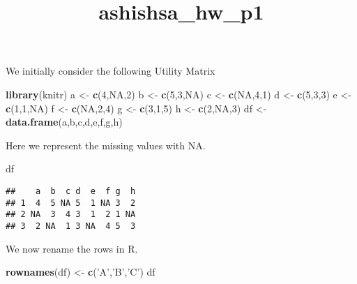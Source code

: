 \documentclass[
]{article}
\title{ashishsa\_hw\_p1}
\author{}
\date{\vspace{-2.5em}}
\newenvironment{Shaded}{\begin{snugshade}}{\end{snugshade}}
\newcommand{\DecValTok}[1]{\textcolor[rgb]{0.00,0.00,0.81}{#1}}
\newcommand{\KeywordTok}[1]{\textcolor[rgb]{0.13,0.29,0.53}{\textbf{#1}}}
\newcommand{\NormalTok}[1]{#1}
\newcommand{\OtherTok}[1]{\textcolor[rgb]{0.56,0.35,0.01}{#1}}
\newcommand{\StringTok}[1]{\textcolor[rgb]{0.31,0.60,0.02}{#1}}
\begin{document}
\maketitle

We initially consider the following Utility Matrix

\begin{Shaded}
\begin{Highlighting}[]
\KeywordTok{library}\NormalTok{(knitr)}
\NormalTok{a <-}\StringTok{ }\KeywordTok{c}\NormalTok{(}\DecValTok{4}\NormalTok{,}\OtherTok{NA}\NormalTok{,}\DecValTok{2}\NormalTok{)}
\NormalTok{b <-}\StringTok{ }\KeywordTok{c}\NormalTok{(}\DecValTok{5}\NormalTok{,}\DecValTok{3}\NormalTok{,}\OtherTok{NA}\NormalTok{)}
\NormalTok{c <-}\StringTok{ }\KeywordTok{c}\NormalTok{(}\OtherTok{NA}\NormalTok{,}\DecValTok{4}\NormalTok{,}\DecValTok{1}\NormalTok{)}
\NormalTok{d <-}\StringTok{ }\KeywordTok{c}\NormalTok{(}\DecValTok{5}\NormalTok{,}\DecValTok{3}\NormalTok{,}\DecValTok{3}\NormalTok{)}
\NormalTok{e <-}\StringTok{ }\KeywordTok{c}\NormalTok{(}\DecValTok{1}\NormalTok{,}\DecValTok{1}\NormalTok{,}\OtherTok{NA}\NormalTok{)}
\NormalTok{f <-}\StringTok{ }\KeywordTok{c}\NormalTok{(}\OtherTok{NA}\NormalTok{,}\DecValTok{2}\NormalTok{,}\DecValTok{4}\NormalTok{)}
\NormalTok{g <-}\StringTok{ }\KeywordTok{c}\NormalTok{(}\DecValTok{3}\NormalTok{,}\DecValTok{1}\NormalTok{,}\DecValTok{5}\NormalTok{)}
\NormalTok{h <-}\StringTok{ }\KeywordTok{c}\NormalTok{(}\DecValTok{2}\NormalTok{,}\OtherTok{NA}\NormalTok{,}\DecValTok{3}\NormalTok{)}
\NormalTok{df <-}\StringTok{ }\KeywordTok{data.frame}\NormalTok{(a,b,c,d,e,f,g,h)}
\end{Highlighting}
\end{Shaded}

Here we represent the missing values with NA.

\begin{Shaded}
\begin{Highlighting}[]
\NormalTok{df}
\end{Highlighting}
\end{Shaded}

\begin{verbatim}
##    a  b  c d  e  f g  h
## 1  4  5 NA 5  1 NA 3  2
## 2 NA  3  4 3  1  2 1 NA
## 3  2 NA  1 3 NA  4 5  3
\end{verbatim}

We now rename the rows in R.

\begin{Shaded}
\begin{Highlighting}[]
\KeywordTok{rownames}\NormalTok{(df) <-}\StringTok{ }\KeywordTok{c}\NormalTok{(}\StringTok{'A'}\NormalTok{,}\StringTok{'B'}\NormalTok{,}\StringTok{'C'}\NormalTok{)}
\NormalTok{df}
\end{Highlighting}
\end{Shaded}
\end{document}
